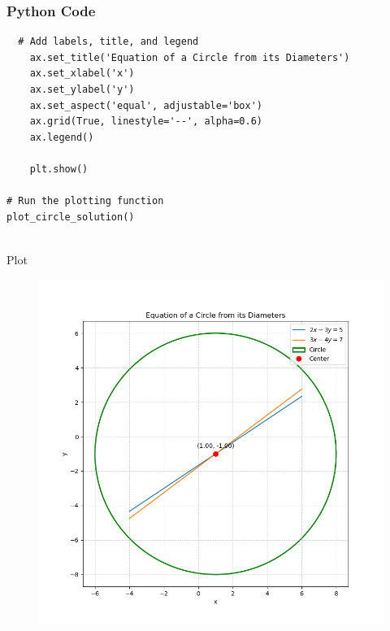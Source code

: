 \documentclass{beamer}
\begin{document}
\begin{frame}[fragile]
    \frametitle{Python Code }
    \begin{lstlisting}
  # Add labels, title, and legend
    ax.set_title('Equation of a Circle from its Diameters')
    ax.set_xlabel('x')
    ax.set_ylabel('y')
    ax.set_aspect('equal', adjustable='box')
    ax.grid(True, linestyle='--', alpha=0.6)
    ax.legend()
    
    plt.show()

# Run the plotting function
plot_circle_solution()


          \end{lstlisting}
\end{frame} 

\begin{frame}{Plot}

\begin{figure}
    \centering
    \includegraphics[width=0.6\linewidth]{Beamer/figs/circle.png}
    \caption{}
    \label{fig:placeholder}
\end{figure}

\end{frame}
\end{document}
